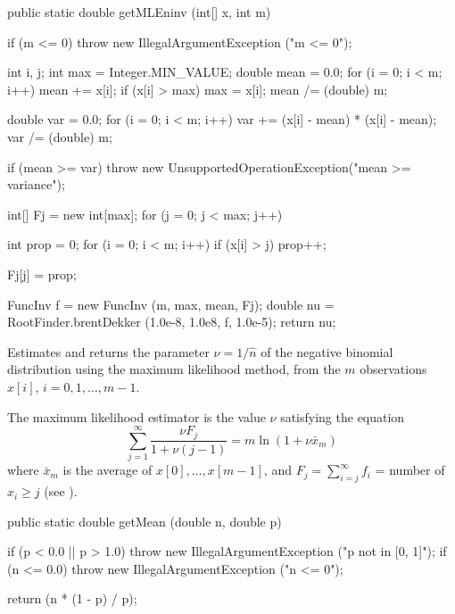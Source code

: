 \begin{code}

   public static double getMLEninv (int[] x, int m)\begin{hide} {
      if (m <= 0)
         throw new IllegalArgumentException ("m <= 0");

      int i, j;
      int max = Integer.MIN_VALUE;
      double mean = 0.0;
      for (i = 0; i < m; i++) {
         mean += x[i];
         if (x[i] > max)
            max = x[i];
      }
      mean /= (double) m;

      double var = 0.0;
      for (i = 0; i < m; i++)
         var += (x[i] - mean) * (x[i] - mean);
      var /= (double) m;

      if (mean >= var) {
         throw new UnsupportedOperationException("mean >= variance");
      }

      int[] Fj = new int[max];
      for (j = 0; j < max; j++) {
         int prop = 0;
         for (i = 0; i < m; i++)
            if (x[i] > j)
               prop++;

         Fj[j] = prop;
      }

      FuncInv f = new FuncInv (m, max, mean, Fj);
      double nu = RootFinder.brentDekker (1.0e-8, 1.0e8, f, 1.0e-5);
      return nu;
   }\end{hide}
\end{code}
\begin{tabb}
   Estimates  and returns the parameter $\nu = 1/\hat{n}$
   of the negative binomial distribution
   using the maximum likelihood method, from the $m$ observations
   $x[i]$, $i = 0, 1, \ldots, m-1$.
   \begin{detailed}
   The maximum likelihood estimator is the value $\nu$
   satisfying the equation
   \[
     \sum_{j=1}^{\infty} \frac{\nu F_j}{1 + \nu (j - 1)} = m\ln (1 + \nu\bar x_m)
   \]
   where  $\bar x_m$ is the average of $x[0],\dots,x[m-1]$, and
   $F_j = \sum_{i=j}^{\infty} f_i$ = number of $x_i \ge j$ (see
   \cite[page 132]{tJOH69a}).
   \end{detailed}
\end{tabb}
\begin{htmlonly}
\end{htmlonly}
\begin{code}

   public static double getMean (double n, double p)\begin{hide} {
      if (p < 0.0 || p > 1.0)
         throw new IllegalArgumentException ("p not in [0, 1]");
      if (n <= 0.0)
         throw new IllegalArgumentException ("n <= 0");

      return (n * (1 - p) / p);
   }\end{hide}
\end{code}
